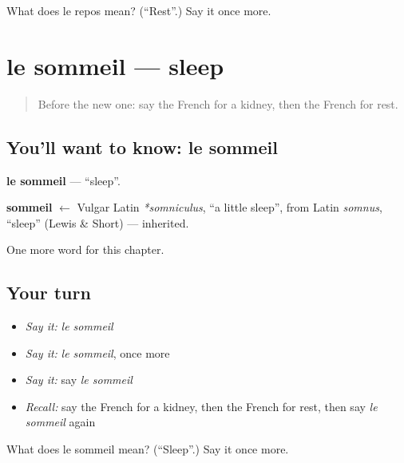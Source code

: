 \begin{tcolorbox}[breakable,colback=teal!4,colframe=teal!35!black,title={Before you move on}]
What does le repos mean? (\textquotedblleft{}Rest\textquotedblright{}.) Say it once more.
\end{tcolorbox}
\section[le sommeil]{le sommeil — sleep}

\label{lesson:FR-C155-sommeil}



\begin{quote}
Before the new one: say the French for a kidney, then the French for rest.
\end{quote}

\subsection*{You'll want to know: le sommeil}
\textbf{le sommeil} — \textquotedblleft{}sleep\textquotedblright{}.

\begin{cousinweb}
\textbf{sommeil} $\leftarrow$ Vulgar Latin \emph{*somniculus}, \textquotedblleft{}a little sleep\textquotedblright{}, from Latin \emph{somnus}, \textquotedblleft{}sleep\textquotedblright{} (Lewis \& Short) — inherited.
\end{cousinweb}

\begin{grammarlens}[title={What you've built}]
One more word for this chapter.
\end{grammarlens}

\subsection*{Your turn}
\begin{itemize}
\raggedright
  \item \emph{Say it:} \emph{le sommeil}
  \item \emph{Say it:} \emph{le sommeil}, once more
  \item \emph{Say it:} say \emph{le sommeil}
  \item \emph{Recall:} say the French for a kidney, then the French for rest, then say \emph{le sommeil} again
\end{itemize}

\begin{tcolorbox}[breakable,colback=teal!4,colframe=teal!35!black,title={Before you move on}]
What does le sommeil mean? (\textquotedblleft{}Sleep\textquotedblright{}.) Say it once more.
\end{tcolorbox}
